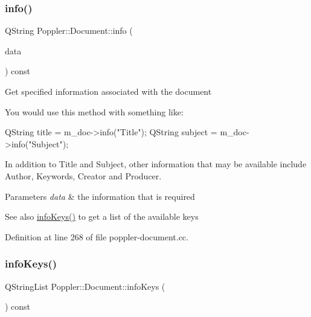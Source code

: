 \mbox{\label{class_poppler_1_1_document_a9ef8eb4458c344ca1533d9af02bc98d5}} 
\subsubsection{\texorpdfstring{info()}{info()}}
{\footnotesize\ttfamily Q\+String Poppler\+::\+Document\+::info (\begin{DoxyParamCaption}\item[{const Q\+String \&}]{data }\end{DoxyParamCaption}) const}

Get specified information associated with the document

You would use this method with something like\+: 
\begin{DoxyCode}
QString title = m\_doc->info(\textcolor{stringliteral}{"Title"});
QString subject = m\_doc->info(\textcolor{stringliteral}{"Subject"});
\end{DoxyCode}


In addition to {\ttfamily Title} and {\ttfamily Subject}, other information that may be available include {\ttfamily Author}, {\ttfamily Keywords}, {\ttfamily Creator} and {\ttfamily Producer}.


\begin{DoxyParams}{Parameters}
{\em data} & the information that is required\\
\hline
\end{DoxyParams}
\begin{DoxySeeAlso}{See also}
\hyperlink{class_poppler_1_1_document_a476e9e81b22ead0bf46e086bda3abe98}{info\+Keys()} to get a list of the available keys 
\end{DoxySeeAlso}


Definition at line 268 of file poppler-\/document.\+cc.

\mbox{\label{class_poppler_1_1_document_a476e9e81b22ead0bf46e086bda3abe98}} 
\subsubsection{\texorpdfstring{info\+Keys()}{infoKeys()}}
{\footnotesize\ttfamily Q\+String\+List Poppler\+::\+Document\+::info\+Keys (\begin{DoxyParamCaption}{ }\end{DoxyParamCaption}) const}

